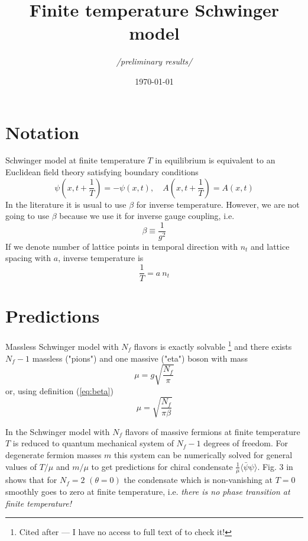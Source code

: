 \documentclass[12pt,a4paper]{article}
\title{Finite temperature Schwinger model}
\author{\em{/preliminary results/}}
\date{\today}
\begin{document}
\maketitle

\section{Notation}

Schwinger model at finite temperature $T$ in equilibrium is equivalent to an Euclidean field theory satisfying boundary conditions \cite{Hosotani:1995gn}
\begin{equation}
  \psi(x, t + \frac{1}{T}) = -\psi(x, t), \quad A(x, t + \frac{1}{T}) = A(x, t)
\end{equation}
In the literature it is usual to use $\beta$ for inverse temperature. However, we are not going to use $\beta$ because we use it for inverse gauge coupling, i.e.
\begin{equation}
  \beta \equiv \frac{1}{g^2}  \label{eq:beta}
\end{equation}
If we denote number of lattice points in temporal direction with $n_t$ and lattice spacing with $a$, inverse temperature is
\begin{equation}
  \frac{1}{T} = a\: n_t  \label{eq:inv-temp}
\end{equation}


\section{Predictions}

Massless Schwinger model with $N_{\!f}$ flavors is exactly solvable \cite{Affleck:1985wa}\footnote{Cited after \cite{Hetrick:1995wq} --- I have no access to full text of \cite{Affleck:1985wa} to check it!} and there exists $N_{\!f} - 1$ massless ("pions") and one massive ("eta") boson with mass
\begin{equation}
  \mu = g \sqrt{\frac{N_{\!f}}{\pi}}
\end{equation}
or, using definition (\ref{eq:beta})
\begin{equation}
  \mu = \sqrt{\frac{N_{\!f}}{\pi \beta}}  \label{eq:mu-beta}
\end{equation}

In \cite{Hetrick:1995yx} the Schwinger model with $N_{\!f}$ flavors of massive fermions at finite temperature $T$ is reduced to quantum mechanical system of $N_{\!f} - 1$ degrees of freedom. For degenerate fermion masses $m$ this system can be numerically solved for general values of $T/\mu$ and $m/\mu$ to get predictions for chiral condensate $\frac{1}{\mu}\langle\bar{\psi}\psi\rangle$. Fig. 3 in \cite{Hetrick:1995yx} shows that for $N_{\!f} = 2$ $(\theta = 0)$ the condensate which is non-vanishing at $T = 0$ smoothly goes to zero at finite temperature, i.e. {\em there is no phase transition at finite temperature!}
\end{document}
